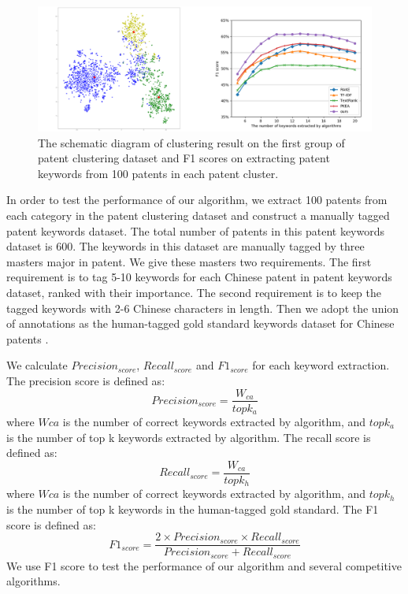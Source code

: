 \documentclass[conference]{IEEEtran}
\begin{document}
	\begin{figure}[hb]
		\centering
		\includegraphics[scale=0.34]{bxd_TSNE_F1.png} 
		\caption{The schematic diagram of clustering result on the first group of patent clustering dataset and F1 scores on extracting patent keywords from 100 patents in each patent cluster.}
		\label{bxd_TSNE_F1}
	\end{figure}
	In order to test the performance of our algorithm, we extract 100 patents from each category in the patent clustering dataset and construct a manually tagged patent keywords dataset. The total number of patents in this patent keywords dataset is 600. The keywords in this dataset are manually tagged by three masters major in patent. We give these masters two requirements. The first requirement is to tag 5-10 keywords for each Chinese patent in patent keywords dataset, ranked with their importance. The second requirement is to keep the tagged keywords with 2-6 Chinese characters in length. Then we adopt the union of annotations as the human-tagged gold standard keywords dataset for Chinese patents \cite{b26}.

	We calculate $Precision_{score}$, $Recall_{score} $ and $F1_{score} $ for each keyword extraction. The precision score is defined as:
	\begin{equation}
	Precision_{score}=\frac{W_{ca}}{topk_a}\label{eq4}
	\end{equation}
	where $W{ca}$ is the number of correct keywords extracted by algorithm, and $topk_a$ is the number of top k keywords extracted by algorithm. The recall score is defined as:
	\begin{equation}
	Recall_{score}=\frac{W_{ca}}{topk_h}\label{eq5}
	\end{equation}
	where $W{ca}$ is the number of correct keywords extracted by algorithm, and $topk_h$ is the number of top k keywords in the human-tagged gold standard. The F1 score is defined as:
	\begin{equation}
	F1_{score}=\frac{2\times Precision_{score}\times Recall_{score}}{Precision_{score}+Recall_{score}}\label{eq6}
	\end{equation}
	We use F1 score to test the performance of our algorithm and several competitive algorithms.
	
\end{document}
